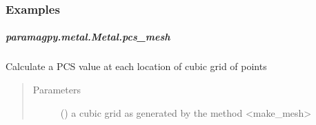 \documentclass[a4paper,10pt,english,openany,oneside]{sphinxmanual}
\begin{document}
\begin{fulllineitems}
\begin{fulllineitems}
\begin{fulllineitems}
\begin{quote}
\begin{description}
\end{description}\end{quote}
\subsubsection*{Examples}

%
\begin{sphinxVerbatim}[commandchars=\\\{\}]
  
\PYG{p}{[}\PYG{p}{]}
\end{sphinxVerbatim}

\end{fulllineitems}



\subparagraph{paramagpy.metal.Metal.pcs\_mesh}
\label{\detokenize{reference/generated/paramagpy.metal.Metal.pcs_mesh:paramagpy-metal-metal-pcs-mesh}}\label{\detokenize{reference/generated/paramagpy.metal.Metal.pcs_mesh::doc}}

\begin{fulllineitems}
\label{\detokenize{reference/generated/paramagpy.metal.Metal.pcs_mesh:paramagpy.metal.Metal.pcs_mesh}}
Calculate a PCS value at each location of cubic grid of points
\begin{quote}\begin{description}
\item[{Parameters}] \leavevmode
{} (\sphinxstyleliteralemphasis{\sphinxupquote{ (}}\sphinxstyleliteralemphasis{\sphinxupquote{,}}\sphinxstyleliteralemphasis{\sphinxupquote{,}}\sphinxstyleliteralemphasis{\sphinxupquote{,}}\sphinxstyleliteralemphasis{\sphinxupquote{)}}) \textendash{} a cubic grid as generated by the method \textless{}make\_mesh\textgreater{}


\end{description}
\end{quote}
\end{fulllineitems}
\end{fulllineitems}
\end{fulllineitems}
\end{document}
